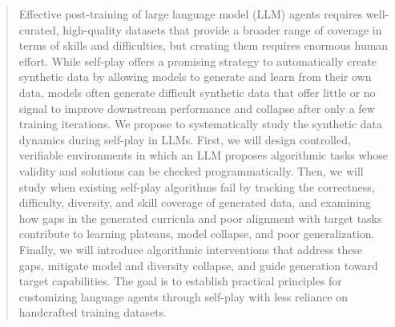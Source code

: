 \begin{abstract}
Effective post-training of large language model (LLM) agents requires well-curated, high-quality datasets that provide a broader range of coverage in terms of skills and difficulties, but creating them requires enormous human effort. 
While self-play offers a promising strategy to automatically create synthetic data by allowing models to generate and learn from their own data, models often generate difficult synthetic data that offer little or no signal to improve downstream performance and collapse after only a few training iterations. 
We propose to systematically study the synthetic data dynamics during self-play in LLMs.
First, we will design controlled, verifiable environments in which an LLM proposes algorithmic tasks whose validity and solutions can be checked programmatically.
Then, we will study when existing self-play algorithms fail by tracking the correctness, difficulty, diversity, and skill coverage of generated data, and examining how gaps in the generated curricula and poor alignment with target tasks contribute to learning plateaus, model collapse, and poor generalization.
Finally, we will introduce algorithmic interventions that address these gaps, mitigate model and diversity collapse, and guide generation toward target capabilities.
The goal is to establish practical principles for customizing language agents through self-play with less reliance on handcrafted training datasets.
\end{abstract}